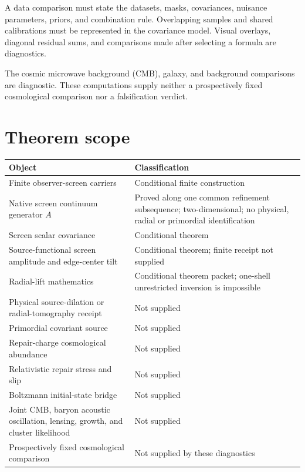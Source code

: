 \documentclass[11pt]{article}
\theoremstyle{remark}
\begin{document}
A data comparison must state the datasets, masks, covariances, nuisance
parameters, priors, and combination rule. Overlapping samples and shared
calibrations must be represented in the covariance model. Visual overlays,
diagonal residual sums, and comparisons made after selecting a formula are
diagnostics.

The cosmic microwave background (CMB), galaxy, and background comparisons are
diagnostic. These computations supply neither a prospectively fixed
cosmological comparison nor a falsification verdict.

\section{Theorem scope}

\begin{center}
\begin{tabularx}{\textwidth}{@{}>{\raggedright\arraybackslash}p{}X@{}}
\toprule
Object & Classification \\
\midrule
Finite observer-screen carriers & Conditional finite construction \\
Native screen continuum generator \(A\) & Proved along one common refinement
subsequence; two-dimensional; no physical, radial or primordial identification \\
Screen scalar covariance & Conditional theorem \\
Source-functional screen amplitude and edge-center tilt & Conditional theorem; finite receipt not supplied \\
Radial-lift mathematics & Conditional theorem packet; one-shell unrestricted inversion is impossible \\
Physical source-dilation or radial-tomography receipt & Not supplied \\
Primordial covariant source & Not supplied \\
Repair-charge cosmological abundance & Not supplied \\
Relativistic repair stress and slip & Not supplied \\
Boltzmann initial-state bridge & Not supplied \\
Joint CMB, baryon acoustic oscillation, lensing, growth, and cluster likelihood &
Not supplied \\
Prospectively fixed cosmological comparison & Not supplied by these diagnostics \\
\bottomrule
\end{tabularx}
\end{center}
\end{document}
